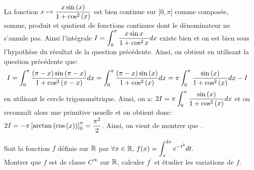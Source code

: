 \documentclass[a4paper, 11pt,reqno]{article}
\begin{document}
\begin{correction}
\begin{enumerate}
		      \noindent La fonction $x\mapsto \displaystyle\frac{x\sin{(x)}}{1+\cos^2{(x)}}$ est bien continue sur $\lbrack 0,\pi\rbrack$ comme compos\'ee, somme, produit et quotient de fonctions continues dont le d\'enominateur ne s'annule pas. Ainsi l'int\'egrale $I=  \displaystyle \int_0^\pi \displaystyle\frac{x\sin{x}}{1+\cos^2{x}} dx$ existe bien et on est bien sous l'hypoth\`{e}se du r\'esultat de la question pr\'ec\'edente. Ainsi, on obtient en utilisant la question pr\'ec\'edente que:
		      $$I=\int_0^{\pi} \displaystyle\frac{(\pi-x)\sin{(\pi-x)}}{1+\cos^2{(\pi-x)}}dx=\int_0^{\pi} \displaystyle\frac{(\pi-x)\sin{(x)}}{1+\cos^2{(x)}}dx=\pi \int_0^{\pi} \displaystyle\frac{\sin{(x)}}{1+\cos^2{(x)}}dx-I$$
		      en utilisant le cercle trigonom\'etrique. Ainsi, on a: $2I= \displaystyle \pi \int_0^{\pi} \displaystyle\frac{\sin{(x)}}{1+\cos^2{(x)}}dx$ et on reconna\^{i}t alors une primitive usuelle et on obtient donc: $ \displaystyle 2I=-\pi \left\lbrack \arctan{(\cos{(x)})} \right\rbrack_0^{\pi}=\displaystyle\frac{\pi^2}{2}$. Ainsi, on vient de montrer que .
	\end{enumerate}
\end{correction}
\vspace{0.5cm}
%
%
%
\begin{exercice}  \;
	Soit la fonction $f$ d\'efinie sur $\mathbb{R}$ par $\forall x\in\mathbb{R},\, \displaystyle f(x)=\int_x^{2x} e^{-t^2}dt.$\\
	Montrer que $f$ est de classe $C^{\infty}$ sur $\mathbb{R}$, calculer $f^{\prime}$ et \'etudier les variations de $f$.
\end{exercice}
\end{document}
